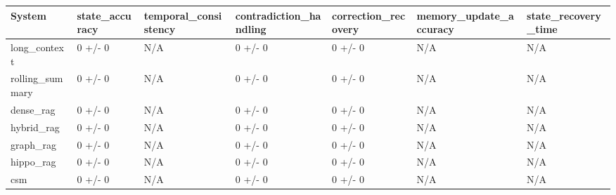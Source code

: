 \begin{tabular}{lllllll}
System & state_accuracy & temporal_consistency & contradiction_handling & correction_recovery & memory_update_accuracy & state_recovery_time \\
\hline
long\_context & 0 +/- 0 & N/A & 0 +/- 0 & 0 +/- 0 & N/A & N/A \\
rolling\_summary & 0 +/- 0 & N/A & 0 +/- 0 & 0 +/- 0 & N/A & N/A \\
dense\_rag & 0 +/- 0 & N/A & 0 +/- 0 & 0 +/- 0 & N/A & N/A \\
hybrid\_rag & 0 +/- 0 & N/A & 0 +/- 0 & 0 +/- 0 & N/A & N/A \\
graph\_rag & 0 +/- 0 & N/A & 0 +/- 0 & 0 +/- 0 & N/A & N/A \\
hippo\_rag & 0 +/- 0 & N/A & 0 +/- 0 & 0 +/- 0 & N/A & N/A \\
csm & 0 +/- 0 & N/A & 0 +/- 0 & 0 +/- 0 & N/A & N/A \\
\end{tabular}
